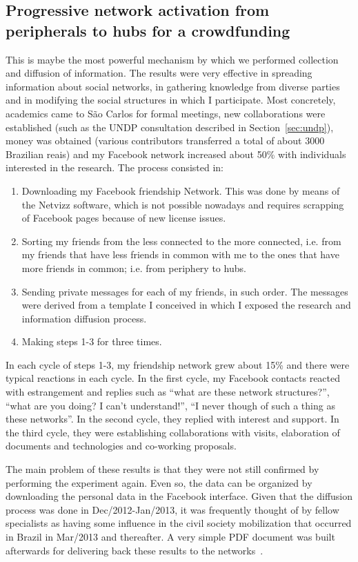 \begin{apendicesenv}
\subsection{Progressive network activation from peripherals to hubs for a crowdfunding}
This is maybe the most powerful mechanism by which we performed collection and diffusion of information.
The results were very effective in spreading information about social networks,
in gathering knowledge from diverse parties and in modifying the social structures
in which I participate.
Most concretely, academics came to São Carlos for formal meetings,
new collaborations were established (such as the UNDP consultation described in Section~\ref{sec:undp}),
money was obtained (various contributors transferred a total of about 3000 Brazilian reais)
and my Facebook network increased about 50\% with individuals interested in the research.
The process consisted in:
\begin{enumerate}
	\item Downloading my Facebook friendship Network. This was done by means of the Netvizz software,
		which is not possible nowadays and requires scrapping of Facebook pages because of new license issues.
	\item Sorting my friends from the less connected to the more connected, i.e. from my friends that have less friends in common with me to the ones that have more friends in common; i.e. from periphery to hubs.
	\item Sending private messages for each of my friends, in such order.
		The messages were derived from a template I conceived in which I exposed the research and information diffusion process.
	\item Making steps 1-3 for three times.
\end{enumerate}
In each cycle of steps 1-3, my friendship network grew about 15\% and there were typical reactions in each cycle.
In the first cycle, my Facebook contacts reacted with estrangement and replies such as ``what are these network structures?'',
``what are you doing? I can't understand!'', ``I never though of such a thing as these networks''.
In the second cycle, they replied with interest and support.
In the third cycle, they were establishing collaborations with visits, elaboration of documents and technologies and
co-working proposals.

The main problem of these results is that they were not still confirmed by performing the experiment again.
Even so, the data can be organized by downloading the personal data in the Facebook interface.
Given that the diffusion process was done in Dec/2012-Jan/2013, it was frequently thought of by fellow specialists as
having some influence in the civil society mobilization that occurred in Brazil in Mar/2013 and thereafter.
A very simple PDF document was built afterwards for delivering back these results to the networks~\cite{docDif}.


\end{apendicesenv}
